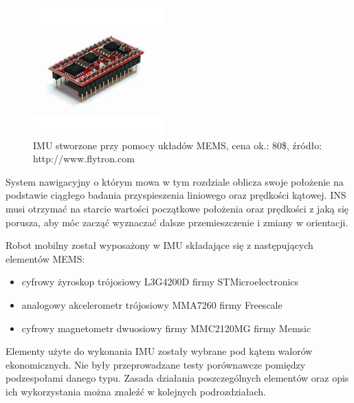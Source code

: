 \begin{figure}[!ht]
 \centering
 \includegraphics[height=50mm]{../images/ch04/mems_imu.jpg}
 \caption{IMU stworzone przy pomocy układów MEMS, cena ok.: 80\$, źródło: http://www.flytron.com}
 \label{fig:Zyrokompas}
\end{figure}

System nawigacyjny o którym mowa w tym rozdziale oblicza swoje położenie na
podstawie ciągłego badania przyspieszenia liniowego oraz prędkości kątowej. INS
musi otrzymać na starcie wartości początkowe położenia oraz prędkości z jaką się
porusza, aby móc zacząć wyznaczać dalsze przemieszczenie i zmiany w orientacji.

Robot mobilny został wyposażony w IMU składające się z następujących elementów MEMS:
\begin{itemize}
  \item cyfrowy żyroskop trójosiowy L3G4200D firmy STMicroelectronics
  \item analogowy akcelerometr trójosiowy MMA7260 firmy Freescale
  \item cyfrowy magnetometr dwuosiowy firmy MMC2120MG firmy Memsic
\end{itemize}
Elementy użyte do wykonania IMU zostały wybrane pod kątem walorów ekonomicznych. 
Nie były przeprowadzane testy porównawcze pomiędzy podzespołami danego typu.
Zasada działania poszczególnych elementów oraz opis ich wykorzystania można znaleźć w kolejnych podrozdziałach.
